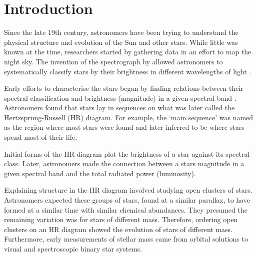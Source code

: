 %
%
%
%
%
\chapter{Introduction}

Since the late 19th century, astronomers have been trying to understand the physical structure and evolution of the Sun and other stars. While little was known at the time, researchers started by gathering data in an effort to map the night sky. The invention of the spectrograph by \citet{Draper1874} allowed astronomers to systematically classify stars by their brightness in different wavelengths of light \citep{Maury.Pickering1897}.


Early efforts to characterise the stars began by finding relations between their spectral classification and brightness (magnitude) in a given spectral band \citep[e.g.][]{Russell1914}. Astronomers found that stars lay in sequences on what was later called the Hertzsprung-Russell (HR) diagram. For example, the `main sequence' was named as the region where most stars were found and later inferred to be where stars spend most of their life.

Initial forms of the HR diagram plot the brightness of a star against its spectral class. Later, astronomers made the connection between a stars magnitude in a given spectral band and the total radiated power (luminosity).

Explaining structure in the HR diagram involved studying open clusters of stars. Astronomers expected these groups of stars, found at a similar parallax, to have formed at a similar time with similar chemical abundances. They presumed the remaining variation was for stars of different mass. Therefore, ordering open clusters on an HR diagram showed the evolution of stars of different mass. Furthermore, early measurements of stellar mass came from orbital solutions to visual and spectroscopic binary star systems.


